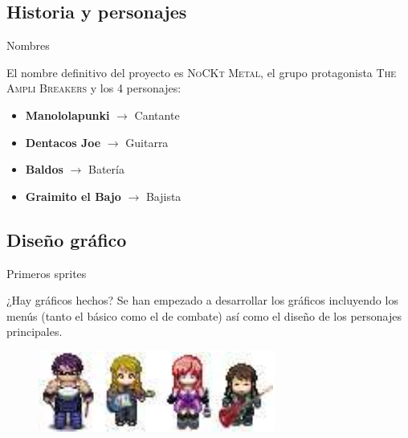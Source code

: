 \documentclass[9pt,xcolor=svgnames]{beamer}
\begin{document}
  \subsection{Historia y personajes}
  
  \begin{frame}{Nombres}
   \transdissolve
   
   El nombre definitivo del proyecto es \textsc{NoCKt
   Metal}, el grupo protagonista \textsc{The Ampli Breakers} y los
   4 personajes:
   \begin{itemize}
    \item \textbf{Manololapunki} $\longrightarrow$ Cantante
    \item \textbf{Dentacos Joe} $\longrightarrow$ Guitarra
    \item \textbf{Baldos} $\longrightarrow$ Batería
    \item \textbf{Graimito el Bajo} $\longrightarrow$ Bajista
   \end{itemize}
   
  \end{frame}
  
  \subsection{Diseño gráfico}
  
  \begin{frame}{Primeros sprites}
   \transdissolve
   
   \begin{block}{¿Hay gráficos hechos?}
   Se han empezado a desarrollar los gráficos incluyendo los menús (tanto el básico como el de combate) así como el diseño de los personajes principales.
   \end{block}
   
   \pause
   
   \begin{figure}[t]
    \centering
    \includegraphics[scale=1]{./Imagenes/grupo.pdf}    
   \end{figure}
  \end{frame}
  
  
  
\end{document}

